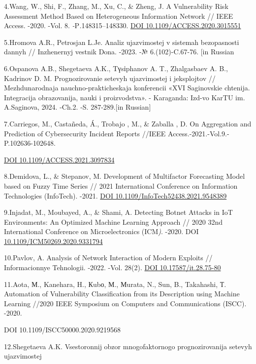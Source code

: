4.Wang, W., Shi, F., Zhang, M., Xu, C., \& Zheng, J. A Vulnerability
Risk Assessment Method Based on Heterogeneous Information Network //
IEEE Access. -2020. -Vol. 8. \emph{-}P\emph{.}148315--148330.
\href{https://doi.org/10.1109/ACCESS.2020.3015551}{DOI
10.1109/ACCESS.2020.3015551}

5.Hromova A.R., Petrosjan L.Je. Analiz ujazvimostej v sistemah
bezopasnosti dannyh // Inzhenernyj vestnik Dona. -2023. -№
6.(102)-C.67-76. {[}in Russian

6.Ospanova A.B., Shegetaeva A.K., Tүsіphanov A. T., Zhalgasbaev A. B.,
Kadrinov D. M. Prognozirovanie setevyh ujazvimostej i jeksplojtov //
Mezhdunarodnaja nauchno-prakticheskaja konferencii «XVI Saginovskie
chtenija. Integracija obrazovanija, nauki i proizvodstva». - Karaganda:
Izd-vo KarTU im. A.Saginova, 2024. -Ch.2. -S. 287-289.{[}in Russian{]}

7.Carriegos, M., Castañeda, Á., Trobajo , M., \& Zaballa , D. On
Aggregation and Prediction of Cybersecurity Incident Reports //IEEE
Access.-2021.-Vol.9.-P.102636-102648.

\href{https://doi.org/10.1109/ACCESS.2021.3097834}{DOI
10.1109/ACCESS.2021.3097834}

8.Demidova, L., \& Stepanov, M. Development of Multifactor Forecasting
Model based on Fuzzy Time Series // 2021 International Conference on
Information Technologies (InfoTech). -2021.
\href{https://doi.org/10.1109/InfoTech52438.2021.9548389}{DOI
10.1109/InfoTech52438.2021.9548389}

9.Injadat, M., Moubayed, A., \& Shami, A. Detecting Botnet Attacks in
IoT Environments: An Optimized Machine Learning Approach // 2020 32nd
International Conference on Microelectronics (ICM\emph{)}. -2020. DOI
\href{https://doi.org/10.1109/ICM50269.2020.9331794}{10.1109/ICM50269.2020.9331794}

10.Pavlov, A. Analysis of Network Interaction of Modern Exploits //
Informacionnye Tehnologii. -2022. -Vol. 28(2).
\href{https://doi.org/10.17587/it.28.75-80}{DOI 10.17587/it.28.75-80}

11.Aota, М., Kanehara, H., Кubо, М., Мurata, N., Sun, B., Takahashi, Т.
Automation of Vulnerability Classification from its Description using
Machine Learning //2020 IEEE Symposium on Computers and Communications
(ISCC). -2020.

DOI 10.1109/ISCC50000.2020.9219568

12.Shegetaeva A.K. Vsestoronnij obzor mnogofaktornogo prognozirovanija
setevyh ujazvimostej

